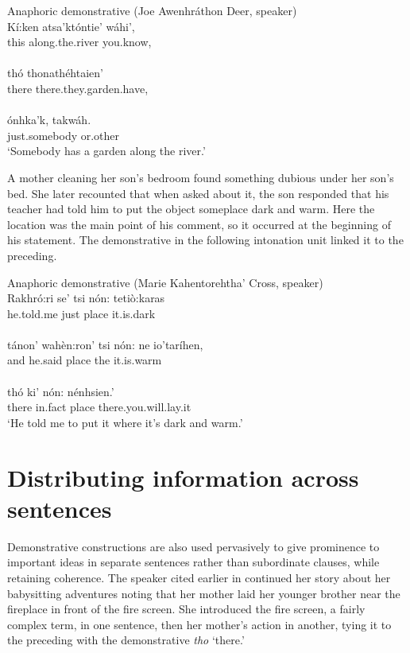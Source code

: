 \documentclass[output=paper,colorlinks,citecolor=brown]{langscibook}
\begin{document}
\ea \label{ex:mithun:11} Anaphoric demonstrative (Joe Awenhráthon Deer, speaker)\\
\gll Kí:ken atsa'któntie' wáhi',\\
     this {along.the.river} {you.know,}\\
\medskip\\
\gll thó thonathéhtaien'\\
there {there.they.garden.have,}\\
\medskip\\
\gll ónhka'k, takwáh.\\
{just.somebody} {or.other}\\
\glt `Somebody has a garden along the river.'
\z

A mother cleaning her son's bedroom found something dubious under her son's bed. She later recounted that when asked about it, the son responded that his teacher had told him to put the object someplace dark and warm. Here the location was the main point of his comment, so it occurred at the beginning of his statement. The demonstrative in the following intonation unit linked it to the preceding.


\ea\label{ex:mithun:12} Anaphoric demonstrative (Marie Kahentorehtha' Cross, speaker)\\
\gll  Rakhró:ri    se' {tsi nón:} tetiò:karas\\
      {he.told.me} just place {it.is.dark}\\
\medskip\\
\gll tánon' wahèn:ron' {tsi nón:} ne io'taríhen,\\
and {he.said} place the {it.is.warm}\\
\medskip\\
\gll thó  ki'  nón:  nénhsien.'\\
there {in.fact} place {there.you.will.lay.it}\\
\glt `He told me to put it where it's dark and warm.'
\z

\section{Distributing information across sentences}

Demonstrative constructions are also used pervasively to give prominence to important ideas in separate sentences rather than subordinate clauses, while retaining coherence. The speaker cited earlier in  continued her story about her babysitting adventures noting that her mother laid her younger brother near the fireplace in front of the fire screen. She introduced the fire screen, a fairly complex term, in one sentence, then her mother's action in another, tying it to the preceding with the demonstrative \emph{tho} `there.'
\end{document}
